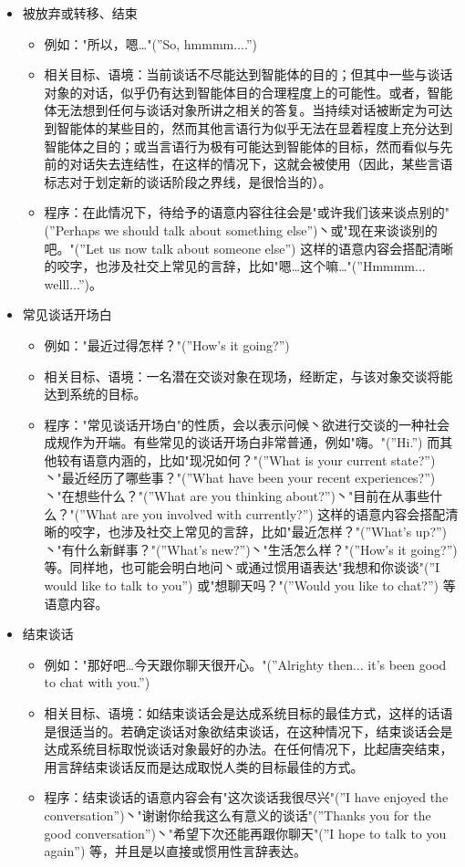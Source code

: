 \begin{itemize}
\item 被放弃或转移、结束
\begin{itemize}
  \item 例如："所以，嗯…"(”So, hmmmm....”)
  \item 相关目标、语境：当前谈话不尽能达到智能体的目的；但其中一些与谈话对象的对话，似乎仍有达到智能体目的合理程度上的可能性。或者，智能体无法想到任何与谈话对象所讲之相关的答复。当持续对话被断定为可达到智能体的某些目的，然而其他言语行为似乎无法在显着程度上充分达到智能体之目的；或当言语行为极有可能达到智能体的目标，然而看似与先前的对话失去连结性，在这样的情况下，这就会被使用（因此，某些言语标志对于划定新的谈话阶段之界线，是很恰当的）。
  \item 程序：在此情况下，待给予的语意内容往往会是"或许我们该来谈点别的"(”Perhaps we should talk about something else”)丶或"现在来谈谈别的吧。"(”Let us now talk about someone else”) 这样的语意内容会搭配清晰的咬字，也涉及社交上常见的言辞，比如"嗯…这个嘛…"(”Hmmmm... welll...”)。
\end{itemize}
\item 常见谈话开场白
  \begin{itemize}
  \item 例如："最近过得怎样？"(”How’s it going?”)
  \item 相关目标、语境：一名潜在交谈对象在现场，经断定，与该对象交谈将能达到系统的目标。
  \item 程序："常见谈话开场白"的性质，会以表示问候丶欲进行交谈的一种社会成规作为开端。有些常见的谈话开场白非常普通，例如"嗨。"(”Hi.”) 而其他较有语意内涵的，比如"现况如何？"(”What is your current state?”)丶"最近经历了哪些事？"(”What have been your recent experiences?”)丶"在想些什么？"(”What are you thinking about?”)丶"目前在从事些什么？"(”What are you involved with currently?”) 这样的语意内容会搭配清晰的咬字，也涉及社交上常见的言辞，比如"最近怎样？"(”What’s up?”)丶"有什么新鲜事？"(”What’s new?”)丶"生活怎么样？"(”How’s it going?”) 等。同样地，也可能会明白地问丶或通过惯用语表达"我想和你谈谈"(”I would like to talk to you”) 或"想聊天吗？"(”Would you like to chat?”) 等语意内容。 
  \end{itemize}
\item 结束谈话
  \begin{itemize}
  \item 例如："那好吧…今天跟你聊天很开心。"(”Alrighty then... it’s been good to chat with you.”)
  \item 相关目标、语境：如结束谈话会是达成系统目标的最佳方式，这样的话语是很适当的。若确定谈话对象欲结束谈话，在这种情况下，结束谈话会是达成系统目标取悦谈话对象最好的办法。在任何情况下，比起唐突结束，用言辞结束谈话反而是达成取悦人类的目标最佳的方式。
  \item 程序：结束谈话的语意内容会有"这次谈话我很尽兴"(”I have enjoyed the conversation”)丶"谢谢你给我这么有意义的谈话"(”Thanks you for the good conversation”)丶"希望下次还能再跟你聊天"(”I hope to talk to you again”) 等，并且是以直接或惯用性言辞表达。
  \end{itemize}
\end{itemize}

